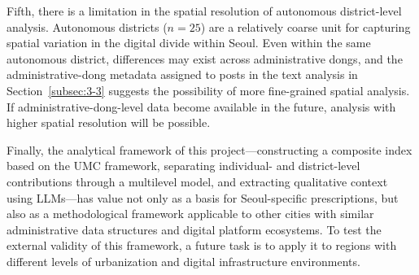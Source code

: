 Fifth, there is a limitation in the spatial resolution of autonomous district-level analysis. Autonomous districts ($n=25$) are a relatively coarse unit for capturing spatial variation in the digital divide within Seoul. Even within the same autonomous district, differences may exist across administrative dongs, and the administrative-dong metadata assigned to posts in the text analysis in Section~\ref{subsec:3-3} suggests the possibility of more fine-grained spatial analysis. If administrative-dong-level data become available in the future, analysis with higher spatial resolution will be possible.

Finally, the analytical framework of this project---constructing a composite index based on the UMC framework, separating individual- and district-level contributions through a multilevel model, and extracting qualitative context using LLMs---has value not only as a basis for Seoul-specific prescriptions, but also as a methodological framework applicable to other cities with similar administrative data structures and digital platform ecosystems. To test the external validity of this framework, a future task is to apply it to regions with different levels of urbanization and digital infrastructure environments.
